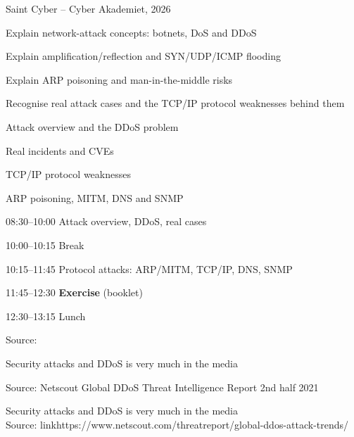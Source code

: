 \documentclass[Screen16to9,17pt]{foils}
\begin{document}
{Saint Cyber -- Cyber Akademiet, 2026}

\begin{list2}
\item Explain network-attack concepts: botnets, DoS and DDoS
\item Explain amplification/reflection and SYN/UDP/ICMP flooding
\item Explain ARP poisoning and man-in-the-middle risks
\item Recognise real attack cases and the TCP/IP protocol weaknesses behind them
\end{list2}

\begin{list2}
\item Attack overview and the DDoS problem
\item Real incidents and CVEs
\item TCP/IP protocol weaknesses
\item ARP poisoning, MITM, DNS and SNMP
\end{list2}

\begin{list2}
\item 08:30--10:00 Attack overview, DDoS, real cases
\item 10:00--10:15 Break
\item 10:15--11:45 Protocol attacks: ARP/MITM, TCP/IP, DNS, SNMP
\item 11:45--12:30 \textbf{Exercise} (booklet)
\item 12:30--13:15 Lunch
\end{list2}


Source: 

Security attacks and DDoS is very much in the media

{\footnotesize Source: Netscout Global DDoS Threat Intelligence Report 2nd half 2021\\
}



Security attacks and DDoS is very much in the media\\
Source: link{https://www.netscout.com/threatreport/global-ddos-attack-trends/}
\end{document}
